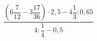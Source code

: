 \begin{ex}[type=calculate]
	\begin{condition}
		\( \dfrac{\left( 6\dfrac{7}{12}-3\dfrac{17}{36} \right)\cdot2,5-4\dfrac{1}{3}:0,65}{4:\dfrac{1}{4}-0,5} \)
	\end{condition}
\end{ex}